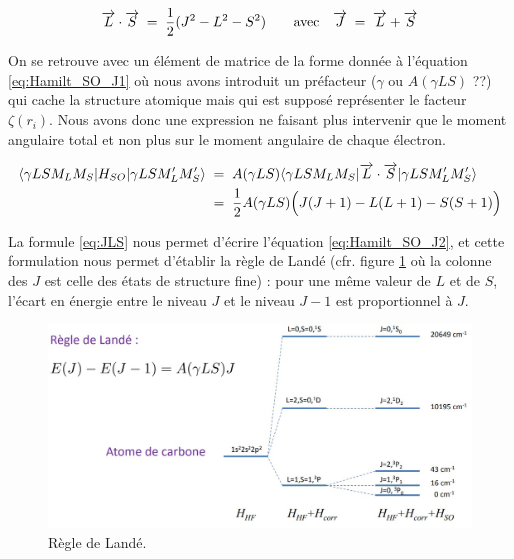 \begin{equation}
    \overrightarrow{L}\cdot\overrightarrow{S} \; = \;  \dfrac{1}{2}(J^2-L^2-S^2) \qquad \mathrm{avec} \quad \overrightarrow{J} \; = \;  \overrightarrow{L}+\overrightarrow{S}
    \label{eq:JLS}
\end{equation}

On se retrouve avec un élément de matrice de la forme donnée à l'équation \eqref{eq:Hamilt_SO_J1} où nous avons introduit un préfacteur ($\gamma$ ou $A(\gamma L S)$ ??) qui cache la structure atomique mais qui est supposé représenter le facteur $\zeta(r_i)$. Nous avons donc une expression ne faisant plus intervenir que le moment angulaire total et non plus sur le moment angulaire de chaque électron.

\begin{align}
    \langle \gamma LSM_LM_S|H_{SO}|\gamma LSM_L'M_S' \rangle &\; = \;  A(\gamma LS)\langle \gamma LSM_LM_S|\overrightarrow{L}\cdot\overrightarrow{S}|\gamma LSM_L'M_S' \rangle
    \label{eq:Hamilt_SO_J1}    \\
    &\; = \;  
    \dfrac{1}{2}A(\gamma LS)\Big( J(J+1)-L(L+1)-S(S+1)\Big)
    \label{eq:Hamilt_SO_J2}
\end{align}

La formule \eqref{eq:JLS} nous permet d’écrire l'équation \eqref{eq:Hamilt_SO_J2}, et cette formulation nous permet d'établir la règle de Landé (cfr. figure \ref{fig:RegleLandé} où la colonne des $J$ est celle des états de structure fine) : pour une même valeur de $L$ et de $S$, l’écart en énergie entre le niveau $J$ et le niveau $J-1$ est proportionnel à $J$.

\begin{figure}[tph]
    \centering
    \includegraphics[scale=0.50]{Images2/regleLande.jpg}
    \caption{Règle de Landé.}
    \label{fig:RegleLandé}
\end{figure}

